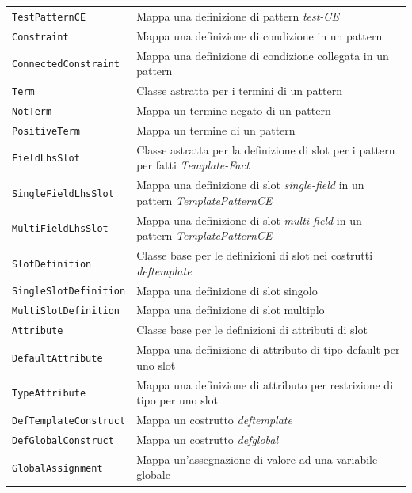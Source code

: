 \begin{longtable}{p{5.5cm}p{6.5cm}}
	\hdashline[1pt/5pt]
		\texttt{TestPatternCE} & Mappa una definizione di pattern \emph{test-CE}\\
	\hdashline[1pt/5pt]
		\texttt{Constraint} & Mappa una definizione di condizione in un pattern\\ 
	\hdashline[1pt/5pt]
		\texttt{ConnectedConstraint} & Mappa una definizione di condizione collegata in un pattern\\ 
	\hdashline[1pt/5pt]
		\texttt{Term} & Classe astratta per i termini di un pattern\\ 
	\hdashline[1pt/5pt]
		\texttt{NotTerm} & Mappa un termine negato di un pattern\\ 
	\hdashline[1pt/5pt]
		\texttt{PositiveTerm} & Mappa un termine di un pattern\\ 
	\hdashline[1pt/5pt]
		\texttt{FieldLhsSlot} & Classe astratta per la definizione di slot per i pattern per fatti \emph{Template-Fact}\\ 
	\hdashline[1pt/5pt]
		\texttt{SingleFieldLhsSlot} & Mappa una definizione di slot \emph{single-field} in un pattern \emph{TemplatePatternCE}\\ 
	\hdashline[1pt/5pt]
		\texttt{MultiFieldLhsSlot} & Mappa una definizione di slot \emph{multi-field} in un pattern \emph{TemplatePatternCE}\\ 
	\hdashline[1pt/5pt]
		\texttt{SlotDefinition} & Classe base per le definizioni di slot nei costrutti \emph{deftemplate}\\ 
	\hdashline[1pt/5pt]
		\texttt{SingleSlotDefinition} & Mappa una definizione di slot singolo\\ 
	\hdashline[1pt/5pt]
		\texttt{MultiSlotDefinition} & Mappa una definizione di slot multiplo\\ 
	\hdashline[1pt/5pt]
		\texttt{Attribute} & Classe base per le definizioni di attributi di slot\\ 
	\hdashline[1pt/5pt]
		\texttt{DefaultAttribute} & Mappa una definizione di attributo di tipo default per uno slot\\ 
	\hdashline[1pt/5pt]
		\texttt{TypeAttribute} & Mappa una definizione di attributo per restrizione di tipo per uno slot\\ 
	\hdashline[1pt/5pt]
		\texttt{DefTemplateConstruct} & Mappa un costrutto \emph{deftemplate}\\ 
	\hdashline[1pt/5pt]
		\texttt{DefGlobalConstruct} & Mappa un costrutto \emph{defglobal}\\ 
	\hdashline[1pt/5pt]
		\texttt{GlobalAssignment} & Mappa un'assegnazione di valore ad una variabile globale\\ 

\end{longtable}
